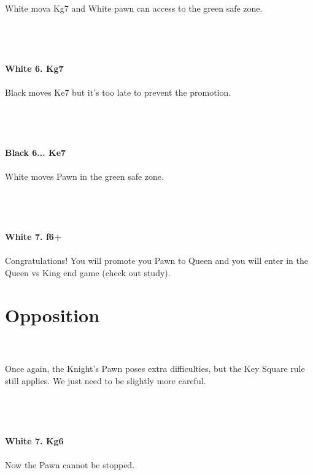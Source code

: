 \documentclass{article}
\begin{document}
White mova Kg7 and White pawn can access to the green safe zone.\\\\
\\

\\
\\
\textbf{White 6. Kg7}\\
\\
Black moves Ke7 but it's too late to prevent the promotion.\\\\
\\

\\
\\
\textbf{Black 6... Ke7}\\
\\
White moves Pawn in the green safe zone.\\\\
\\

\\
\\
\textbf{White 7. f6+}\\
\\
Congratulations! You will promote you Pawn to Queen and you will enter in the Queen vs King end game (check out study).\\\section{ Opposition}

\\
\\
Once again, the Knight's Pawn poses extra difficulties, but the Key Square rule still applies. We just need to be slightly more careful.\\\\
\\

\\
\\
\textbf{White 7. Kg6}\\
\\
Now the Pawn cannot be stopped.\\
\\

\end{document}
